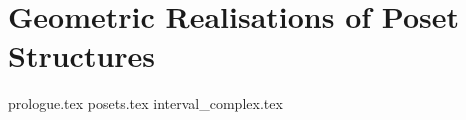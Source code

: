 \documentclass[class=article, crop=false]{standalone}
\begin{document}
\section{Geometric Realisations of Poset Structures}
{prologue.tex}
{posets.tex}
{interval_complex.tex}
\end{document}
